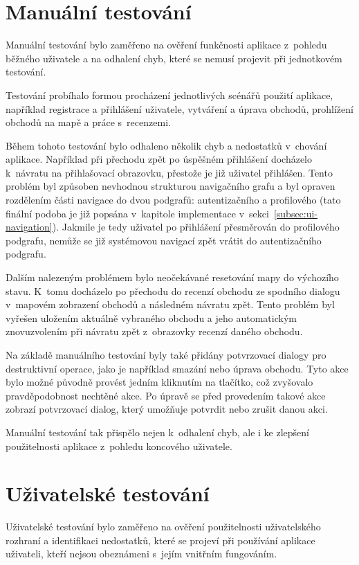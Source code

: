 \section{Manuální testování}
Manuální testování bylo zaměřeno na ověření funkčnosti aplikace z~pohledu běžného uživatele a na odhalení chyb, které se nemusí projevit při jednotkovém testování.

Testování probíhalo formou procházení jednotlivých scénářů použití aplikace, například registrace a přihlášení uživatele, vytváření a úprava obchodů, prohlížení obchodů na mapě a práce s~recenzemi.

Během tohoto testování bylo odhaleno několik chyb a nedostatků v~chování aplikace.
Například při přechodu zpět po úspěšném přihlášení docházelo k~návratu na přihlašovací obrazovku, přestože je již uživatel přihlášen.
Tento problém byl způsoben nevhodnou strukturou navigačního grafu a byl opraven rozdělením části navigace do dvou podgrafů: autentizačního a profilového (tato finální podoba je již popsána v~kapitole implementace v~sekci~\ref{subsec:ui-navigation}).
Jakmile je tedy uživatel po přihlášení přesměrován do profilového podgrafu, nemůže se již systémovou navigací zpět vrátit do autentizačního podgrafu.

Dalším nalezeným problémem bylo neočekávané resetování mapy do výchozího stavu.
K~tomu docházelo po přechodu do recenzí obchodu ze spodního dialogu v~mapovém zobrazení obchodů a následném návratu zpět.
Tento problém byl vyřešen uložením aktuálně vybraného obchodu a jeho automatickým znovuzvolením při návratu zpět z~obrazovky recenzí daného obchodu.

Na základě manuálního testování byly také přidány potvrzovací dialogy pro destruktivní operace, jako je například smazání nebo úprava obchodu.
Tyto akce bylo možné původně provést jedním kliknutím na tlačítko, což zvyšovalo pravděpodobnost nechtěné akce.
Po úpravě se před provedením takové akce zobrazí potvrzovací dialog, který umožňuje potvrdit nebo zrušit danou akci.

Manuální testování tak přispělo nejen k~odhalení chyb, ale i ke zlepšení použitelnosti aplikace z~pohledu koncového uživatele.


\section{Uživatelské testování}
Uživatelské testování bylo zaměřeno na ověření použitelnosti uživatelského rozhraní a identifikaci nedostatků, které se projeví při používání aplikace uživateli, kteří nejsou obeznámeni s~jejím vnitřním fungováním.

